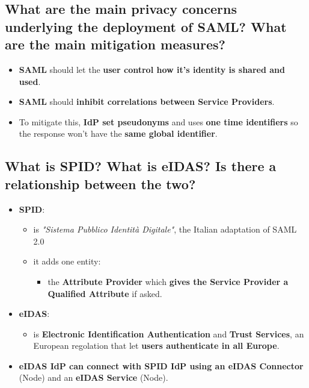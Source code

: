\documentclass[9pt, letterpaper]{article}
\begin{document}
\subsection{What are the main privacy concerns underlying the deployment of SAML? What are the main mitigation measures?}
\begin{itemize}
	\item \textbf{SAML} should let the \textbf{user control how it's identity is shared and used}.
	\item \textbf{SAML} should \textbf{inhibit correlations between Service Providers}.
	\item To mitigate this, \textbf{IdP set pseudonyms} and uses \textbf{one time identifiers} so the response won't have the \textbf{same global identifier}.
\end{itemize}

\newpage

\subsection{What is SPID? What is eIDAS? Is there a relationship between the two?}
\begin{itemize}
	\item \textbf{SPID}:
	      \begin{itemize}
		      \item is \textit{"Sistema Pubblico Identità Digitale"}, the Italian adaptation of SAML 2.0
		      \item it adds one entity:
		            \begin{itemize}
			            \item the \textbf{Attribute Provider} which \textbf{gives the Service Provider a Qualified Attribute} if asked.
		            \end{itemize}
	      \end{itemize}
	\item \textbf{eIDAS}:
	      \begin{itemize}
		      \item is \textbf{Electronic Identification Authentication} and \textbf{Trust Services}, an European regolation that let \textbf{users authenticate in all Europe}.
	      \end{itemize}
	\item \textbf{eIDAS IdP can connect with SPID IdP using an eIDAS Connector} (Node) and an \textbf{eIDAS Service} (Node).
\end{itemize}
\end{document}

